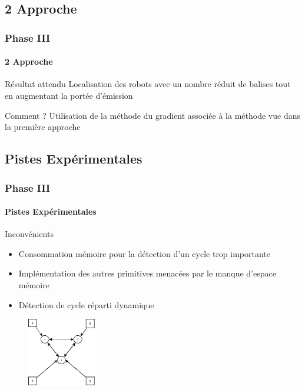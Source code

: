 \documentclass[xcolor=table]{beamer}
\begin{document}
\subsection{2 Approche}
\begin{frame}
  \frametitle{Phase III}
  \framesubtitle{2 Approche}
  \begin{block}{Résultat attendu}
    Localisation des robots avec un nombre réduit de balises tout en augmentant la portée d'émission
  \end{block}
  \begin{block}{Comment ?}
    Utilisation de la méthode du gradient associée à la méthode vue dans la première approche
  \end{block}
\end{frame}

\subsection{Pistes Expérimentales}
\begin{frame}
  \frametitle{Phase III}
  \framesubtitle{Pistes Expérimentales}
  \begin{block}{Inconvénients}
    \begin{itemize}
      [triangle]
    \item Consommation mémoire pour la détection d'un cycle trop importante \pause
    \item Implémentation des autres primitives menacées par le manque d'espace mémoire \pause
    \item Détection de cycle réparti dynamique
    \end{itemize}
  \end{block}
  \pause
  \begin{figure}[!h]
    \includegraphics[width=3cm]{schema_cycle.png}
  \end{figure}
\end{frame}

\end{document}
